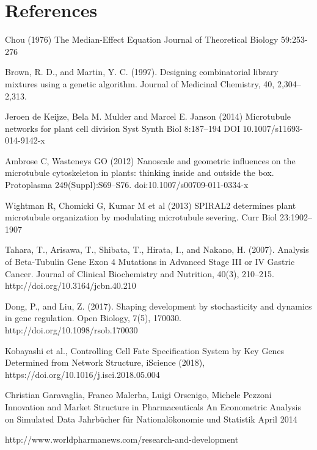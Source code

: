 

\section{References}

Chou (1976)
\newblock The Median-Effect Equation
\newblock Journal of Theoretical Biology 59:253-276 

Brown, R. D., and Martin, Y. C. (1997). 
\newblock Designing combinatorial library mixtures using a genetic algorithm. 
\newblock Journal of Medicinal Chemistry, 40, 2,304–2,313.

Jeroen de Keijze, Bela M. Mulder and Marcel E. Janson (2014)
\newblock Microtubule networks for plant cell division
\newblock Syst Synth Biol 8:187–194 DOI 10.1007/s11693-014-9142-x

 Ambrose   C,   Wasteneys   GO   (2012)   
\newblock Nanoscale  and  geometric influences  on  the  microtubule  cytoskeleton  in  plants:  thinking inside  and  outside  the  box.  
\newblock Protoplasma  249(Suppl):S69–S76. doi:10.1007/s00709-011-0334-x

 Wightman   R,   Chomicki   G,   Kumar   M   et   al   (2013)   
\newblock SPIRAL2 determines plant microtubule organization by modulating microtubule severing. 
\newblock Curr Biol 23:1902–1907

Tahara, T., Arisawa, T., Shibata, T., Hirata, I., and Nakano, H. (2007). 
\newblock Analysis of Beta-Tubulin Gene Exon 4 Mutations in Advanced Stage III or IV Gastric Cancer. 
\newblock Journal of Clinical Biochemistry and Nutrition, 40(3), 210–215. http://doi.org/10.3164/jcbn.40.210

Dong, P., and Liu, Z. (2017). 
\newblock Shaping development by stochasticity and dynamics in gene regulation. 
\newblock Open Biology, 7(5), 170030. http://doi.org/10.1098/rsob.170030

Kobayashi et al., 
\newblock Controlling Cell Fate Specification System by Key Genes Determined from Network Structure,
\newblock iScience (2018), https://doi.org/10.1016/j.isci.2018.05.004

 Christian Garavaglia, Franco Malerba, Luigi Orsenigo, Michele Pezzoni
\newblock Innovation and Market Structure in Pharmaceuticals An Econometric Analysis on Simulated Data
\newblock Jahrbücher für Nationalökonomie und Statistik  April 2014

 http://www.worldpharmanews.com/research-and-development




